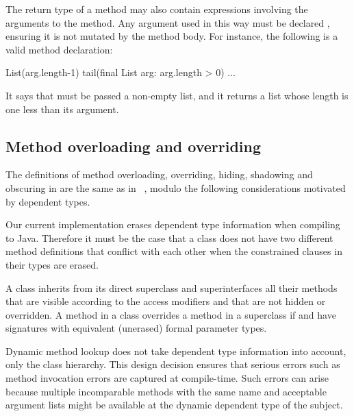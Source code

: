 The
return type of a method may also contain expressions involving the
arguments to the method.  Any argument used in this way must
be declared ,
ensuring it is not mutated by the method body.  For instance,
the following is a valid method declaration:
\begin{displayxten}
List(arg.length-1)
  tail(final List arg: arg.length > 0) {
     ...
}
\end{displayxten}
\noindent
It says that
 must be passed a non-empty list, and it returns a list
whose length is one less than its argument.

\subsection{Method overloading and overriding}

The definitions of method overloading, overriding, hiding,
shadowing and obscuring in \Xten{} are the same as in
\Java~\cite{Java3}, modulo the following considerations
motivated by dependent types.

Our current implementation
erases dependent type information when compiling to Java. Therefore it
must be the case that a class does not have two different method
definitions that conflict with each other when the constrained
clauses in their types are erased.

A class  inherits from its direct superclass and
superinterfaces all their methods that are visible according to the access
modifiers and that are not hidden or overridden. A method
 in a class  overrides a method  in a
superclass  if  and  have signatures
with equivalent (unerased) formal parameter types. 

Dynamic method lookup does not take dependent type information into
account, only the class hierarchy. This design decision ensures that
serious errors such as method invocation errors are captured at
compile-time. Such errors can arise because multiple incomparable
methods with the same name and acceptable argument lists might be
available at the dynamic dependent type of the subject.


